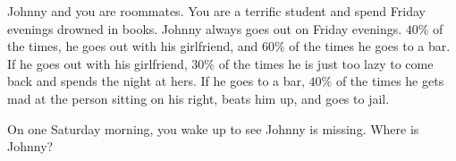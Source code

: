 \begin{problem}
  Johnny and you are roommates. You are a terrific student and spend Friday
  evenings drowned in books. Johnny always goes out on Friday
  evenings. \(40\%\) of the times, he goes out with his girlfriend, and
  \(60\%\) of the times he goes to a bar. If he goes out with his
  girlfriend, \(30\%\) of the times he is just too lazy to come back and
  spends the night at hers. If he goes to a bar, \(40\%\) of the times he
  gets mad at the person sitting on his right, beats him up, and goes to
  jail.

  \noindent
  On one Saturday morning, you wake up to see Johnny is missing. Where is
  Johnny?
\end{problem}
\begin{solution*}
\end{solution*}

